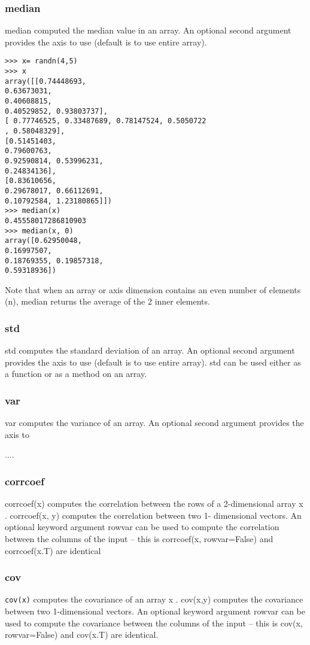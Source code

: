 \documentclass[KSmain.tex]{subfiles}
\begin{document}
\subsubsection{median}
median computed the median value in an array. An optional second argument provides the axis to use
(default is to use entire array).
\begin{framed}
\begin{verbatim}
>>> x= randn(4,5)
>>> x
array([[0.74448693,
0.63673031,
0.40608815,
0.40529852, 0.93803737],
[ 0.77746525, 0.33487689, 0.78147524, 0.5050722
, 0.58048329],
[0.51451403,
0.79600763,
0.92590814, 0.53996231,
0.24834136],
[0.83610656,
0.29678017, 0.66112691,
0.10792584, 1.23180865]])
>>> median(x)
0.45558017286810903
>>> median(x, 0)
array([0.62950048,
0.16997507,
0.18769355, 0.19857318,
0.59318936])
\end{verbatim}
\end{framed}
Note that when an array or axis dimension contains an even number of elements (n), median returns the
average of the 2 inner elements.
\subsubsection{std}
std computes the standard deviation of an array. An optional second argument provides the axis to use
(default is to use entire array). std can be used either as a function or as a method on an array.
\subsubsection{var}
var computes the variance of an array. An optional second argument provides the axis to

....

\subsubsection{corrcoef}
corrcoef(x) computes the correlation between the rows of a 2-dimensional array x . corrcoef(x, y) computes
the correlation between two 1- dimensional vectors. An optional keyword argument rowvar can be
used to compute the correlation between the columns of the input – this is corrcoef(x, rowvar=False)
and corrcoef(x.T) are identical



\subsubsection{cov}
\texttt{cov(x)} computes the covariance of an array x . cov(x,y) computes the covariance between two 1-dimensional
vectors. An optional keyword argument rowvar can be used to compute the covariance between the
columns of the input – this is cov(x, rowvar=False) and cov(x.T) are identical.
\end{document}
